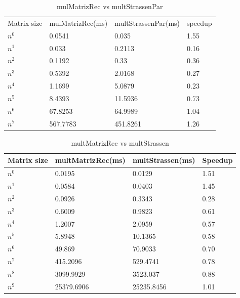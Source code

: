 \documentclass[12pt, a4paper]{article}
\begin{document}
\begin{table}[h]
    \centering
    \begin{tabular}{ | m{2cm} | m{4cm} | m{4cm} | m{3cm} | }
    \hline
    Matrix size & mulMatrizRec(ms) & multStrassenPar(ms) & speedup \\ 
    $n^0$ & 0.0541 & 0.035 & 1.55 \\
    $n^1$ & 0.033 & 0.2113 & 0.16 \\
    $n^2$ & 0.1192 & 0.33 & 0.36 \\
    $n^3$ & 0.5392 & 2.0168 & 0.27 \\
    $n^4$ & 1.1699 & 5.0879 & 0.23 \\
    $n^5$ & 8.4393 & 11.5936 & 0.73 \\
    $n^6$ & 67.8253 & 64.9989 & 1.04 \\
    $n^7$ & 567.7783 & 451.8261 & 1.26 \\
    \hline
    \end{tabular}
    \caption{mulMatrizRec vs multStrassenPar}
    \label{table:matrix_performance}
\end{table}   

\begin{table}[h]
\centering
    \begin{tabular}{ | m{2cm} | m{4cm} | m{4cm} | m{3cm} | }
    \hline
    Matrix size & multMatrizRec(ms) & multStrassen(ms) & Speedup \\ 
    \hline
    $n^0$ & 0.0195 & 0.0129 & 1.51 \\
    $n^1$ & 0.0584 & 0.0403 & 1.45 \\
    $n^2$ & 0.0926 & 0.3343 & 0.28 \\
    $n^3$ & 0.6009 & 0.9823 & 0.61 \\
    $n^4$ & 1.2007 & 2.0959 & 0.57 \\
    $n^5$ & 5.8948 & 10.1365 & 0.58 \\
    $n^6$ & 49.869 & 70.9033 & 0.70 \\
    $n^7$ & 415.2096 & 529.4741 & 0.78 \\
    $n^8$ & 3099.9929 & 3523.037 & 0.88 \\
    $n^9$ & 25379.6906 & 25235.8456 & 1.01 \\
    \hline
    \end{tabular}
    \caption{multMatrizRec vs multStrassen}
    \label{table:matrix_comparison}
\end{table} 
\end{document}

